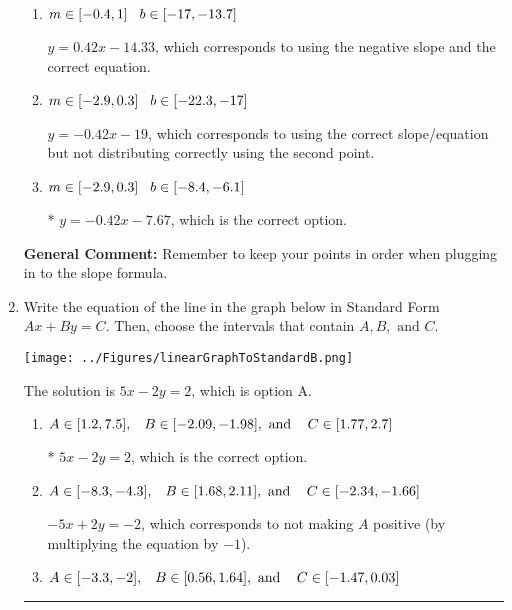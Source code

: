 \documentclass{extbook}[14pt]
\newcommand{\litem}[1]{\item #1

\rule{\textwidth}{0.4pt}}
\begin{document}
\begin{enumerate}
{\begin{enumerate}[label=\Alph*.]
 $y = -0.42x + 7.67$, which corresponds to using the correct slope and getting the negative y-intercept.
\item \( m \in [-0.4, 1] \hspace*{3mm} b \in [-17, -13.7] \)

 $y = 0.42x -14.33$, which corresponds to using the negative slope and the correct equation.
\item \( m \in [-2.9, 0.3] \hspace*{3mm} b \in [-22.3, -17] \)

 $y = -0.42x -19$, which corresponds to using the correct slope/equation but not distributing correctly using the second point.
\item \( m \in [-2.9, 0.3] \hspace*{3mm} b \in [-8.4, -6.1] \)

* $y = -0.42x -7.67$, which is the correct option.
\end{enumerate}

\textbf{General Comment:} Remember to keep your points in order when plugging in to the slope formula.
}
\litem{
Write the equation of the line in the graph below in Standard Form $Ax+By=C$. Then, choose the intervals that contain $A, B, \text{ and } C$.

\begin{center}
    \texttt{[image: ../Figures/linearGraphToStandardB.png]}
\end{center}


The solution is \( 5x - 2y = 2 \), which is option A.\begin{enumerate}[label=\Alph*.]
\item \( A \in [1.2, 7.5], \hspace{3mm} B \in [-2.09, -1.98], \text{ and } \hspace{3mm} C \in [1.77, 2.7] \)

* $5x - 2y = 2$, which is the correct option.
\item \( A \in [-8.3, -4.3], \hspace{3mm} B \in [1.68, 2.11], \text{ and } \hspace{3mm} C \in [-2.34, -1.66] \)

 $-5x + 2y = -2$, which corresponds to not making $A$ positive (by multiplying the equation by $-1$).
\item \( A \in [-3.3, -2], \hspace{3mm} B \in [0.56, 1.64], \text{ and } \hspace{3mm} C \in [-1.47, 0.03] \)


\end{enumerate}}
\end{enumerate}
\end{document}
